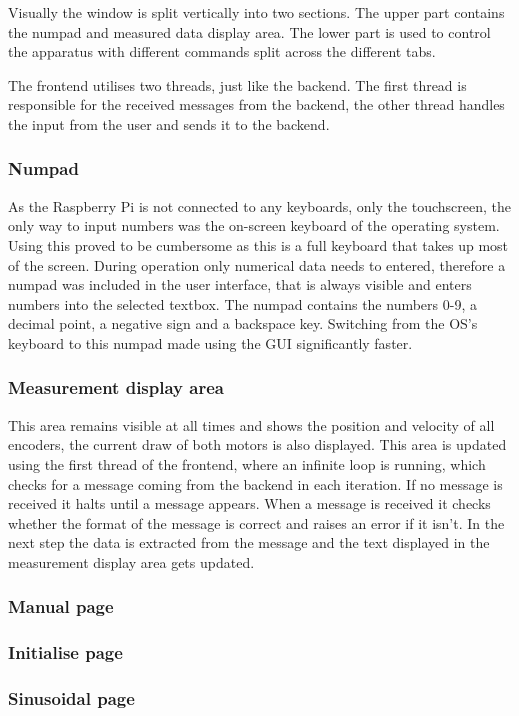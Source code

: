 \documentclass[12pt]{article}
\begin{document}
Visually the window is split vertically into two sections. The upper part contains the numpad and measured data display area. The lower part is used to control the apparatus with different commands split across the different tabs.

The frontend utilises two threads, just like the backend. The first thread is responsible for the received messages from the backend, the other thread handles the input from the user and sends it to the backend.


\subsubsection{Numpad}
As the Raspberry Pi is not connected to any keyboards, only the touchscreen, the only way to input numbers was the on-screen keyboard of the operating system. Using this proved to be cumbersome as this is a full keyboard that takes up most of the screen. During operation only numerical data needs to entered, therefore a numpad was included in the user interface, that is always visible and enters numbers into the selected textbox. The numpad contains the numbers 0-9, a decimal point, a negative sign and a backspace key. Switching from the OS's keyboard to this numpad made using the GUI significantly faster.


\subsubsection{Measurement display area}
This area remains visible at all times and shows the position and velocity of all encoders, the current draw of both motors is also displayed. This area is updated using the first thread of the frontend, where an infinite loop is running, which checks for a message coming from the backend in each iteration. If no message is received it halts until a message appears. When a message is received it checks whether the format of the message is correct and raises an error if it isn't. In the next step the data is extracted from the message and the text displayed in the measurement display area gets updated. 

\subsubsection{Manual page}
\subsubsection{Initialise page}
\subsubsection{Sinusoidal page}
\end{document}
